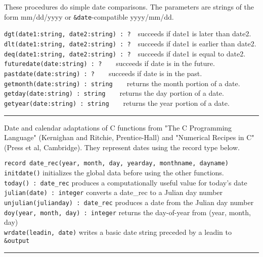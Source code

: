 These procedures do simple date comparisons. The
parameters are strings of the form mm/dd/yyyy or
\texttt{\&date}{}-compatible yyyy/mm/dd.

\texttt{dgt(date1:string, date2:string) : ?}\ \ succeeds if date1 is later than
date2.\\
\texttt{dlt(date1:string, date2:string) : ?}\ \ succeeds if date1 is earlier than
date2.\\
\texttt{deq(date1:string, date2:string) : ?}\ \ succeeds if date1 is equal to
date2.\\
\texttt{futuredate(date:string) : ?}\ \ \ \ succeeds if date is in the
future.\\
\texttt{pastdate(date:string) : ?}\ \ \ \ succeeds if date is in the
past.\\
\texttt{getmonth(date:string) : string}\ \ \ \ returns the month portion of a
date.\\
\texttt{getday(date:string) : string}\ \ \ \ returns the day portion of a
date.\\
\texttt{getyear(date:string) : string}\ \ \ \ returns the year portion of a date.

\vspace{0.25cm}\hrule{}

Date and calendar adaptations of C functions from
"The C Programming Language" (Kernighan and
Ritchie, Prentice-Hall) and "Numerical Recipes in
C" (Press et al, Cambridge). They represent dates using
the record type below.

\texttt{record date\_rec(year, month, day, yearday, monthname,
dayname)}\\
\texttt{initdate()} initializes the global data before using the other
functions.\\
\texttt{today() : date\_rec} produces a computationally useful value for
today's date\\
\texttt{julian}\texttt{(date) : integer} converts a
date\_rec to a Julian day number\\
\texttt{unjulian(julianday) : date\_rec} produces a date from the Julian
day number\\
\texttt{doy(year, month, day) : integer} returns the day-of-year from
(year, month, day)\\
\texttt{wrdate(leadin, date)} writes a
basic date string preceded by a leadin to \texttt{\&output}

\vspace{0.25cm}\hrule{}

